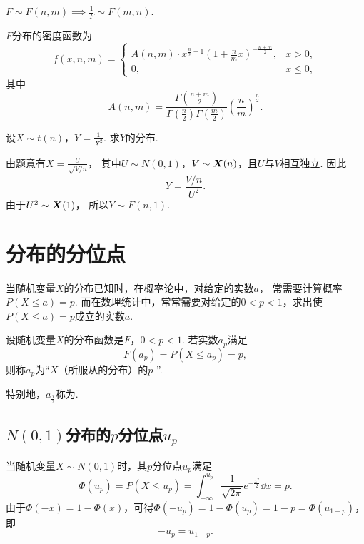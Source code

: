 \begin{proposition}
\(F \sim F(n,m) \implies \frac{1}{F} \sim F(m,n)\).
\end{proposition}

\begin{theorem}
\(F\)分布的密度函数为\begin{equation}
	f(x,n,m) = \left\{ \begin{array}{cl}
		A(n,m) \cdot x^{\frac{n}{2}-1}
		\left(1+\frac{n}{m}x\right)^{-\frac{n+m}{2}},
		& x > 0, \\
		0, & x \leq 0,
	\end{array} \right.
\end{equation}
其中\[
	A(n,m)=\frac{
		\Gamma\left(\frac{n+m}{2}\right)
	}{
		\Gamma\left(\frac{n}{2}\right) \Gamma\left(\frac{m}{2}\right)
	}
	\left(\frac{n}{m}\right)^{\frac{n}{2}}.
\]
\end{theorem}

\begin{example}
设\(X \sim t(n)\)，\(Y=\frac{1}{X^2}\).
求\(Y\)的分布.
\begin{solution}
由题意有\(X = \frac{U}{\sqrt{V/n}}\)，
其中\(U \sim N(0,1)\)，\(V \sim \boldsymbol{X}(n)\)，且\(U\)与\(V\)相互独立.
因此\[
	Y = \frac{V/n}{U^2}.
\]
由于\(U^2 \sim \boldsymbol{X}(1)\)，
所以\(Y \sim F(n,1)\).
\end{solution}
\end{example}

\section{分布的分位点}
当随机变量\(X\)的分布已知时，在概率论中，对给定的实数\(a\)，
常需要计算概率\(P(X \leq a) = p\).
而在数理统计中，常常需要对给定的\(0<p<1\)，求出使\(P(X \leq a) = p\)成立的实数\(a\).

\begin{definition}
设随机变量\(X\)的分布函数是\(F\)，\(0<p<1\).
若实数\(a_p\)满足\[
	F(a_p) = P(X \leq a_p) = p,
\]
则称\(a_p\)为“\(X\)（所服从的分布）的\(p\) ”.

特别地，\(a_{\frac{1}{2}}\)称为.
\end{definition}

\subsection{\texorpdfstring{\(N(0,1)\)分布的\(p\)分位点\(u_p\)}{标准正态分布的p分位点}}
当随机变量\(X \sim N(0,1)\)时，其\(p\)分位点\(u_p\)满足\[
\Phi(u_p)
= P(X \leq u_p)
= \int_{-\infty}^{u_p} \frac{1}{\sqrt{2\pi}} e^{-\frac{x^2}{2}} \dd{x}
= p.
\]由于\(\Phi(-x)=1-\Phi(x)\)，可得\(\Phi(-u_p)=1-\Phi(u_p)=1-p=\Phi(u_{1-p})\)，即\begin{equation}
-u_p=u_{1-p}.
\end{equation}

